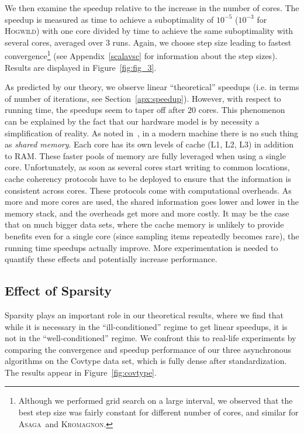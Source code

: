 \documentclass[twoside, 11pt]{article}
\newcommand{\ASAGA}{\textsc{Asaga}}
\newcommand{\Hogwild}{\textsc{Hogwild}}
\newcommand{\KROMAGNON}{\textsc{Kromagnon}}
\begin{document}
We then examine the speedup relative to the increase in the number of cores.
The speedup is measured as time to achieve a suboptimality of $10^{-5}$ ($10^{-3}$ for \Hogwild) with one core divided by time to achieve the same suboptimality with several cores, averaged over 3 runs.
Again, we choose step size leading to fastest convergence\footnote{Although we performed grid search on a large interval, we observed that the best step size was fairly constant for different number of cores, and similar for \ASAGA\ and \KROMAGNON.} (see Appendix~\ref{scalavsc} for information about the step sizes).
Results are displayed in Figure~\ref{fig:fig_3}.

As predicted by our theory, we observe linear ``theoretical'' speedups (i.e. in terms of number of iterations, see Section~\ref{apx:speedup}).
However, with respect to running time, the speedups seem to taper off after $20$ cores.
This phenomenon can be explained by the fact that our hardware model is by necessity a simplification of reality.
As noted in~\citet{duchi}, in a modern machine there is no such thing as \textit{shared memory}.
Each core has its own levels of cache (L1, L2, L3) in addition to RAM.
These faster pools of memory are fully leveraged when using a single core.
Unfortunately, as soon as several cores start writing to common locations, cache coherency protocols have to be deployed to ensure that the information is consistent across cores.
These protocols come with computational overheads.
As more and more cores are used, the shared information goes lower and lower in the memory stack, and the overheads get more and more costly.
It may be the case that on much bigger data sets, where the cache memory is unlikely to provide benefits even for a single core (since sampling items repeatedly becomes rare), the running time speedups actually improve.
More experimentation is needed to quantify these effects and potentially increase performance.

\subsection{Effect of Sparsity}
Sparsity plays an important role in our theoretical results, where we find that while it is necessary in the ``ill-conditioned'' regime to get linear speedups, it is not in the ``well-conditioned'' regime.
We confront this to real-life experiments by comparing the convergence and speedup performance of our three asynchronous algorithms on the Covtype data set, which is fully dense after standardization.
The results appear in Figure~\ref{fig:covtype}.
\end{document}
